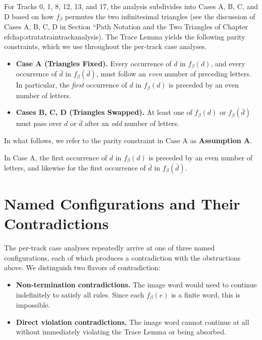 For Tracks 0, 1, 8, 12, 13, and 17, the analysis subdivides into Cases A, B, C, and D based on how $f_\beta$ permutes the two infinitesimal triangles (see the discussion of Cases A, B, C, D in Section ``Path Notation and the Two Triangles of Chapter 
ef{chap:stratatraintrackanalysis}). The Trace Lemma yields the following parity constraints, which we use throughout the per-track case analyses.

\begin{itemize}
    \item \textbf{Case A (Triangles Fixed).} Every occurrence of $d$ in $f_\beta(d)$, and every occurrence of $\bar{d}$ in $f_\beta(\bar{d})$, must follow an \emph{even} number of preceding letters. In particular, the \emph{first} occurrence of $d$ in $f_\beta(d)$ is preceded by an even number of letters.
    \item \textbf{Cases B, C, D (Triangles Swapped).} At least one of $f_\beta(d)$ or $f_\beta(\bar{d})$ must pass over $d$ or $\bar{d}$ after an \emph{odd} number of letters.
\end{itemize}

In what follows, we refer to the parity constraint in Case A as \textbf{Assumption A}.

\begin{assumption}[Assumption A]
\label{assumption_A_appendix}
In Case A, the first occurrence of $d$ in $f_\beta(d)$ is preceded by an even number of letters, and likewise for the first occurrence of $\bar{d}$ in $f_\beta(\bar{d})$.
\end{assumption}

\section{Named Configurations and Their Contradictions}
\label{sec:case_analysis_named_configurations}

The per-track case analyses repeatedly arrive at one of three named configurations, each of which produces a contradiction with the obstructions above. We distinguish two flavors of contradiction:

\begin{itemize}
    \item \textbf{Non-termination contradictions.} The image word would need to continue indefinitely to satisfy all rules. Since each $f_\beta(e)$ is a finite word, this is impossible.
    \item \textbf{Direct violation contradictions.} The image word cannot continue at all without immediately violating the Trace Lemma or being absorbed.
\end{itemize}

